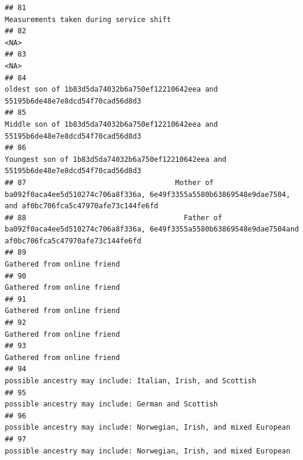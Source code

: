 \documentclass[]{article}
\begin{document}
\begin{verbatim}
## 81                                                                                                              Measurements taken during service shift
## 82                                                                                                                                                 <NA>
## 83                                                                                                                                                 <NA>
## 84                                                                  oldest son of 1b83d5da74032b6a750ef12210642eea and 55195b6de48e7e8dcd54f70cad56d8d3
## 85                                                                  Middle son of 1b83d5da74032b6a750ef12210642eea and 55195b6de48e7e8dcd54f70cad56d8d3
## 86                                                                Youngest son of 1b83d5da74032b6a750ef12210642eea and 55195b6de48e7e8dcd54f70cad56d8d3
## 87                                   Mother of ba092f0aca4ee5d510274c706a8f336a, 6e49f3355a5580b63869548e9dae7504, and af0bc706fca5c47970afe73c144fe6fd
## 88                                     Father of ba092f0aca4ee5d510274c706a8f336a, 6e49f3355a5580b63869548e9dae7504and af0bc706fca5c47970afe73c144fe6fd
## 89                                                                                                                          Gathered from online friend
## 90                                                                                                                          Gathered from online friend
## 91                                                                                                                          Gathered from online friend
## 92                                                                                                                          Gathered from online friend
## 93                                                                                                                          Gathered from online friend
## 94                                                                                          possible ancestry may include: Italian, Irish, and Scottish
## 95                                                                                                   possible ancestry may include: German and Scottish
## 96                                                                                  possible ancestry may include: Norwegian, Irish, and mixed European
## 97                                                                                  possible ancestry may include: Norwegian, Irish, and mixed European

\end{verbatim}
\end{document}
